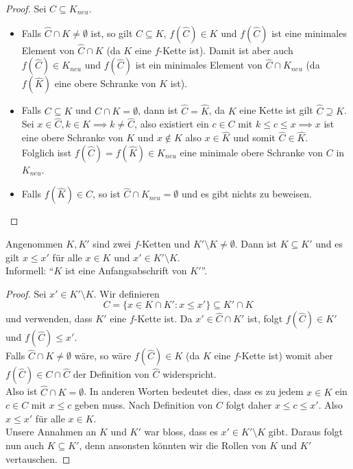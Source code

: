 \begin{proof}
	Sei $C \subseteq K_{neu}$.
	\begin{itemize}
		\item Falls $\widehat{C} \cap K \neq \emptyset$ ist, so gilt $C \subseteq K$, $f(\widehat{C}) \in K$ und $f(\widehat{C})$ ist eine minimales Element von $\widehat{C} \cap K$ 
			(da $K$ eine $f$-Kette ist). Damit ist aber auch $f(\widehat{C}) \in K_{neu}$ und $f(\widehat{C})$ ist ein minimales Element von $\widehat{C} \cap K_{neu}$ 
			(da $f(\widehat{K})$ eine obere Schranke von $K$ ist).
		\item Falls $C \subseteq K$ und $\widehat{C} \cap K = \emptyset$, dann ist $\widehat{C} = \widehat{K}$, da $K$ eine Kette ist gilt $\widehat{C} \supseteq \widehat{K}$.
			Sei $x \in \widehat{C}, k \in K \implies k \neq \widehat{C}$, also existiert ein $c \in C$ mit $k \leq c \leq x \implies x$ ist eine obere Schranke
			von $K$ und $x \not\in  K$ also $x \in \widehat{K}$ und somit $\widehat{C} \in \widehat{K}$.\\
			Folglich isst $f(\widehat{C}) = f(\widehat{K}) \in K_{neu}$ eine minimale obere Schranke von $C$ in $K_{neu}$.
		\item Falls $f(\widehat{K}) \in C$, so ist $\widehat{C} \cap K_{neu} = \emptyset$ und es gibt nichts zu beweisen.
	\end{itemize}
\end{proof}

\begin{lemma}
	Angenommen $K,K'$ sind zwei $f$-Ketten und $K' \setminus K \neq \emptyset$.
	Dann ist $K \subseteq K'$ und es gilt $x \leq x'$ für alle $x \in K$ und $x' \in K' \setminus K$.\\
	Informell: \enquote{$K$ ist eine Anfangsabschrift von $K'$}.
\end{lemma}

\begin{proof}
	Sei $x' \in K' \setminus K$. Wir definieren 
	\[
	C = \{x \in K \cap K' : x \leq x'\} \subseteq K' \cap K
	\] 
	und verwenden, dass $K'$ eine $f$-Kette ist.
	Da $x' \in \widehat{C} \cap K'$ ist, folgt $f(\widehat{C}) \in K'$ und $f(\widehat{C}) \leq x'$.\\
	Falls $\widehat{C} \cap K \neq \emptyset$ wäre, so wäre $f(\widehat{C}) \in K$ (da $K$ eine $f$-Kette ist)
	womit aber $f(\widehat{C}) \in C \cap \widehat{C}$ der Definition von $\widehat{C}$ widerspricht.\\
	Also ist $\widehat{C} \cap K = \emptyset$. In anderen Worten bedeutet dies, dass es zu jedem $x \in K$ ein $c \in C$ mit $x \leq c$ geben muss.
	Nach Definition von $C$ folgt daher $x \leq c \leq x'$. Also $x \leq x'$ für alle $x \in K$.\\
	Unsere Annahmen an $K$ und $K'$ war bloss, dass es $x' \in K' \setminus K$ gibt.
	Daraus folgt nun auch $K \subseteq K'$, denn ansonsten könnten wir die Rollen von $K$ und $K'$ vertauschen.
\end{proof}

